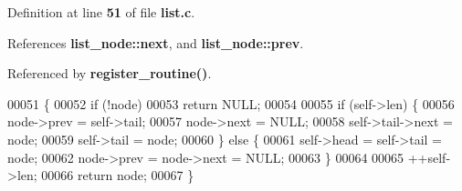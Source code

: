 Definition at line \textbf{ 51} of file \textbf{ list.\+c}.



References \textbf{ list\+\_\+node\+::next}, and \textbf{ list\+\_\+node\+::prev}.



Referenced by \textbf{ register\+\_\+routine()}.


\begin{DoxyCode}
00051                                                          \{
00052   \textcolor{keywordflow}{if} (!node)
00053     \textcolor{keywordflow}{return} NULL;
00054 
00055   \textcolor{keywordflow}{if} (self->len) \{
00056     node->prev = \textcolor{keyword}{self}->tail;
00057     node->next = NULL;
00058     \textcolor{keyword}{self}->tail->next = node;
00059     \textcolor{keyword}{self}->tail = node;
00060   \} \textcolor{keywordflow}{else} \{
00061     \textcolor{keyword}{self}->head = \textcolor{keyword}{self}->tail = node;
00062     node->prev = node->next = NULL;
00063   \}
00064 
00065   ++\textcolor{keyword}{self}->len;
00066   \textcolor{keywordflow}{return} node;
00067 \}
\end{DoxyCode}
